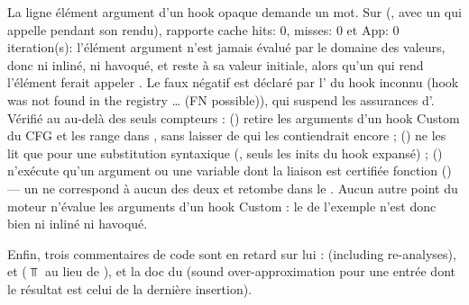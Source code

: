 La ligne \og élément argument d'un hook opaque\fg{} demande un mot. Sur
 (, avec un
 qui appelle  pendant son rendu),  rapporte
\og cache hits: 0, misses: 0\fg{} et \og App: 0 iteration(s)\fg : l'élément argument n'est jamais
évalué par le domaine des valeurs, donc ni inliné, ni havoqué, et  reste à sa valeur
initiale, alors qu'un  qui rend l'élément ferait appeler . Le faux
négatif est déclaré par l'\Info{} du hook inconnu (\og hook  was not found in the
registry … (FN possible)\fg), qui suspend les assurances d'. Vérifié au
\snapshotCommit{} au-delà des seuls compteurs : 
() retire les arguments d'un hook Custom du CFG et
les range dans , sans laisser de  qui les
contiendrait encore ;  () ne les
lit que pour une substitution syntaxique (, seuls les inits  du
hook expansé) ;  () n'exécute
qu'un argument  ou une variable dont la liaison est certifiée fonction
() --- un  ne correspond à aucun des deux et
retombe dans le . Aucun autre point du moteur n'évalue les arguments d'un hook
Custom : le  de l'exemple n'est donc bien ni inliné ni havoqué.

Enfin, trois commentaires de code sont en retard sur lui : 
(\og including re-analyses\fg),  et
 (\og $\Top$\fg{} au lieu de ), et la doc du
 (\og sound over-approximation\fg{} pour une entrée dont le résultat est
celui de la dernière insertion).

